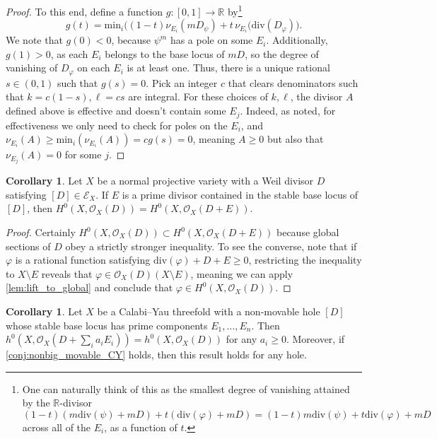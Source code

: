 \documentclass[11pt,dvipsnames]{article}
\theoremstyle{definition}
\newtheorem{corollary}[theorem]{Corollary}
\begin{document}
\begin{proof}
    To this end, define a function $g : [0,1] \to \mathbb{R}$ by\footnote{One can naturally think of this as the smallest degree of vanishing attained by the $\mathbb{R}$-divisor 
    \begin{equation}
        (1 - t)(m\mathrm{div}(\psi) + mD) + t(\mathrm{div}(\varphi) + mD) = (1 - t)m\mathrm{div}(\psi) + t\mathrm{div}(\varphi) + mD
    \end{equation} across all of the $E_i$, as a function of $t$.}
    \begin{equation}
        g(t) = \mathrm{min}_i\Big((1-t)\nu_{E_i}(mD_\psi) + t \, \nu_{E_i}(\mathrm{div}(D_\varphi)\Big).
    \end{equation}
    We note that $g(0) < 0$, because $\psi^m$ has a pole on some $E_i$. Additionally, $g(1) > 0$, as each $E_i$ belongs to the base locus of $mD$, so the degree of vanishing of $D_\varphi$ on each $E_i$ is at least one. Thus, there is a unique rational $s \in (0,1)$ such that $g(s) = 0$. Pick an integer $c$ that clears denominators such that $k = c(1-s), \ell = cs$ are integral. For these choices of $k, \ell$, the divisor $A$ defined above is effective and doesn't contain some $E_j$. Indeed, as noted, for effectiveness we only need to check for poles on the $E_i$, and $\nu_{E_i}(A) \geq \mathrm{min}_i(\nu_{E_i}(A)) = c g(s) = 0$, meaning $A \geq 0$ but also that $\nu_{E_j}(A) = 0$ for some $j$.
\end{proof}
\begin{corollary}
    \label{cor:general_sublattice}
    Let $X$ be a normal projective variety with a Weil divisor $D$ satisfying $[D] \in \mathcal{E}_X$. If $E$ is a prime divisor contained in the stable base locus of $[D]$, then $H^0(X, \mathcal{O}_X(D)) = H^0(X, \mathcal{O}_X(D + E))$.
\end{corollary}
\begin{proof}
    Certainly $H^0(X, \mathcal{O}_X(D)) \subset H^0(X, \mathcal{O}_X(D + E))$ because global sections of $D$ obey a strictly stronger inequality. To see the converse, note that if $\varphi$ is a rational function satisfying $\mathrm{div}(\varphi) + D + E \geq 0$, restricting the inequality to $X \setminus E$ reveals that $\varphi \in \mathcal{O}_X(D)(X \setminus E)$, meaning we can apply \cref{lem:lift_to_global} and conclude that $\varphi \in H^0(X, \mathcal{O}_X(D))$. 
\end{proof}
\begin{corollary}
    Let $X$ be a Calabi--Yau threefold with a non-movable hole $[D]$ whose stable base locus has prime components $E_1, \dots, E_n$. Then $h^0(X, \mathcal{O}_X(D + \sum_i a_i E_i)) = h^0(X, \mathcal{O}_X(D))$ for any $a_i \geq 0$. Moreover, if \cref{conj:nonbig_movable_CY} holds, then this result holds for any hole.
    \label{cor:semigroup}
\end{corollary}
\end{document}
